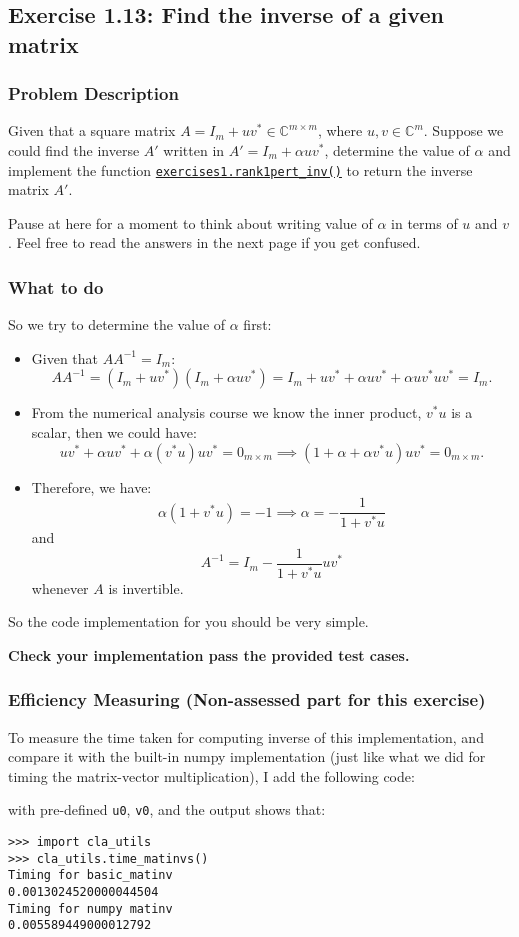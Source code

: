 \subsection*{Exercise 1.13: Find the inverse of a given matrix}%
\subsubsection*{Problem Description}
Given that a square matrix $A = I_m + uv^{*} \in \mathbb{C}^{m \times m}$, where $u, v \in \mathbb{C}^{m}$. Suppose we could find the inverse $A'$ written in  $A' = I_m + \alpha uv^{*}$, determine the value of $\alpha$ and implement the function \href{https://comp-lin-alg.github.io/cla_utils.html#cla_utils.exercises1.rank1pert_inv}{\texttt{exercises1.rank1pert\_inv()}} to return the inverse matrix $A'$. \medskip

\noindent Pause at here for a moment to think about writing value of \(\alpha\) in terms of \(u\) and \(v\). Feel free to read the answers in the next page if you get confused.
\newpage
\subsubsection*{What to do}
\noindent So we try to determine the value of $\alpha$ first:
\begin{itemize}
  \item Given that $A A^{-1} = I_m$:
    \[
      A A^{-1} = (I_m + u v^{*})(I_m + \alpha u v^{*}) = I_m + uv^{*} + \alpha uv^{*} + \alpha u v^{*}uv^{*} = I_m
    .\]
  \item From the numerical analysis course we know the inner product, $v^{*}u$ is a scalar, then we could have:
    \[
      uv^{*} + \alpha uv^{*} + \alpha (v^{*}u)uv^{*} = 0_{m \times m} \implies (1 + \alpha + \alpha v^{*}u)uv^{*} = 0_{m \times m}
    .\]
  \item Therefore, we have:
    \[
    \alpha (1 + v^{*}u) = -1 \implies \alpha = -\frac{1}{1 + v^{*}u}
    \]
    and
    \[
    A^{-1} = I_m -\frac{1}{1 + v^{*}u} uv^{*}
    \]
    whenever $A$ is invertible.
\end{itemize}
So the code implementation for you should be very simple. \medskip

\noindent \textbf{Check your implementation pass the provided test cases.}
\subsubsection*{Efficiency Measuring (Non-assessed part for this exercise)}
To measure the time taken for computing inverse of this implementation, and compare it with the built-in numpy implementation (just like what we did for timing the matrix-vector multiplication), I add the following code:

with pre-defined \texttt{u0}, \texttt{v0}, and the output shows that:
\begin{lstlisting}
>>> import cla_utils
>>> cla_utils.time_matinvs()
Timing for basic_matinv
0.0013024520000044504
Timing for numpy matinv
0.005589449000012792
\end{lstlisting}

